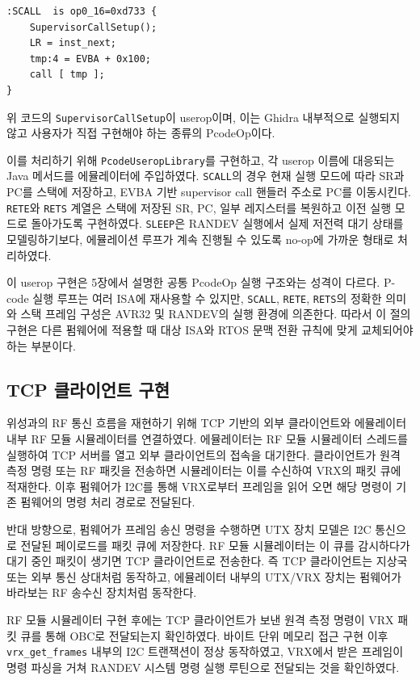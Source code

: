 \documentclass[master,korean,final]{kaist-ucs}
\begin{document}
\begin{verbatim}
:SCALL  is op0_16=0xd733 {
    SupervisorCallSetup();
    LR = inst_next;
    tmp:4 = EVBA + 0x100;
    call [ tmp ];
}
\end{verbatim}

위 코드의 \texttt{SupervisorCallSetup}이 userop이며, 이는 Ghidra 내부적으로 실행되지 않고 사용자가 직접 구현해야 하는 종류의 PcodeOp이다.

이를 처리하기 위해 \texttt{PcodeUseropLibrary}를 구현하고, 각 userop 이름에 대응되는 Java 메서드를 에뮬레이터에 주입하였다. \texttt{SCALL}의 경우 현재 실행 모드에 따라 SR과 PC를 스택에 저장하고, EVBA 기반 supervisor call 핸들러 주소로 PC를 이동시킨다. \texttt{RETE}와 \texttt{RETS} 계열은 스택에 저장된 SR, PC, 일부 레지스터를 복원하고 이전 실행 모드로 돌아가도록 구현하였다. \texttt{SLEEP}은 RANDEV 실행에서 실제 저전력 대기 상태를 모델링하기보다, 에뮬레이션 루프가 계속 진행될 수 있도록 no-op에 가까운 형태로 처리하였다.

이 userop 구현은 5장에서 설명한 공통 PcodeOp 실행 구조와는 성격이 다르다. P-code 실행 루프는 여러 ISA에 재사용할 수 있지만, \texttt{SCALL}, \texttt{RETE}, \texttt{RETS}의 정확한 의미와 스택 프레임 구성은 AVR32 및 RANDEV의 실행 환경에 의존한다. 따라서 이 절의 구현은 다른 펌웨어에 적용할 때 대상 ISA와 RTOS 문맥 전환 규칙에 맞게 교체되어야 하는 부분이다.

\subsection{TCP 클라이언트 구현}

위성과의 RF 통신 흐름을 재현하기 위해 TCP 기반의 외부 클라이언트와 에뮬레이터 내부 RF 모듈 시뮬레이터를 연결하였다. 에뮬레이터는 RF 모듈 시뮬레이터 스레드를 실행하여 TCP 서버를 열고 외부 클라이언트의 접속을 대기한다. 클라이언트가 원격 측정 명령 또는 RF 패킷을 전송하면 시뮬레이터는 이를 수신하여 VRX의 패킷 큐에 적재한다. 이후 펌웨어가 I2C를 통해 VRX로부터 프레임을 읽어 오면 해당 명령이 기존 펌웨어의 명령 처리 경로로 전달된다.

반대 방향으로, 펌웨어가 프레임 송신 명령을 수행하면 UTX 장치 모델은 I2C 통신으로 전달된 페이로드를 패킷 큐에 저장한다. RF 모듈 시뮬레이터는 이 큐를 감시하다가 대기 중인 패킷이 생기면 TCP 클라이언트로 전송한다. 즉 TCP 클라이언트는 지상국 또는 외부 통신 상대처럼 동작하고, 에뮬레이터 내부의 UTX/VRX 장치는 펌웨어가 바라보는 RF 송수신 장치처럼 동작한다.

RF 모듈 시뮬레이터 구현 후에는 TCP 클라이언트가 보낸 원격 측정 명령이 VRX 패킷 큐를 통해 OBC로 전달되는지 확인하였다. 바이트 단위 메모리 접근 구현 이후 \texttt{vrx\_get\_frames} 내부의 I2C 트랜잭션이 정상 동작하였고, VRX에서 받은 프레임이 명령 파싱을 거쳐 RANDEV 시스템 명령 실행 루틴으로 전달되는 것을 확인하였다.
\end{document}
